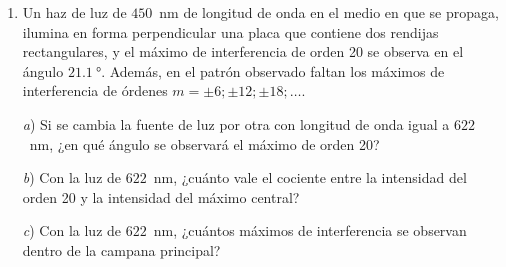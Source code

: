 \documentclass[a4paper,11pt,dvipsnames]{article}
\begin{document}
\begin{enumerate}[leftmargin=*]
\item 
  Un haz de luz de $450$~nm de longitud de onda en el medio en que se propaga, ilumina en forma perpendicular una placa que contiene dos rendijas rectangulares, y el máximo de interferencia de orden 20 se observa en el ángulo $\SI{21.1}{\degree}$. Además, en el patrón observado faltan los máximos de interferencia de órdenes $m=\pm 6; \pm 12; \pm18; \dots$.\par
  \textit{a}) Si se cambia la fuente de luz por otra con longitud de onda igual a $622$~nm, ¿en qué ángulo se observará el máximo de orden 20?\par
  \textit{b}) Con la luz de $622$~nm, ¿cuánto vale el cociente entre la intensidad del orden 20 y la intensidad del máximo central?\par
  \textit{c}) Con la luz de $622$~nm, ¿cuántos máximos de interferencia se observan dentro de la campana principal?\par

\end{enumerate}

\end{document}
